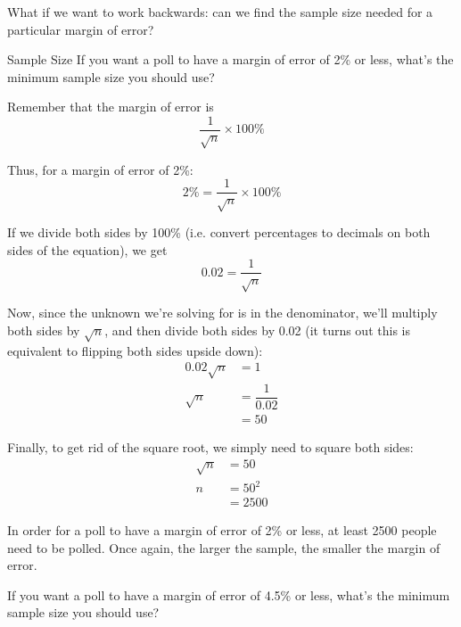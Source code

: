 What if we want to work backwards: can we find the sample size needed for a particular margin of error?

\begin{example}[https://www.youtube.com/watch?v=AQMgQqLd3vY&list=PLfmpjsIzhzttL_Uec2nCbDRcAcUF7NKG8&index=29]{Sample Size}
If you want a poll to have a margin of error of 2\% or less, what's the minimum sample size you should use?

\sol
Remember that the margin of error is 
\[\dfrac{1}{\sqrt{n}} \times 100\%\]

Thus, for a margin of error of 2\%:
\[2\% = \dfrac{1}{\sqrt{n}} \times 100\%\]

If we divide both sides by 100\% (i.e. convert percentages to decimals on both sides of the equation), we get
\[0.02 = \dfrac{1}{\sqrt{n}}\]

Now, since the unknown we're solving for is in the denominator, we'll multiply both sides by $\sqrt{n}$, and then divide both sides by 0.02 (it turns out this is equivalent to flipping both sides upside down):
\begin{align*}
0.02\sqrt{n} &= 1\\
\sqrt{n} &= \dfrac{1}{0.02}\\
&= 50
\end{align*}

Finally, to get rid of the square root, we simply need to square both sides:
\begin{align*}
\sqrt{n} &= 50\\
n &= 50^2\\
&= \boxed{2500}
\end{align*}

In order for a poll to have a margin of error of 2\% or less, at least 2500 people need to be polled.  Once again, the larger the sample, the smaller the margin of error.
\end{example}

\begin{try}
If you want a poll to have a margin of error of 4.5\% or less, what's the minimum sample size you should use?
\end{try}